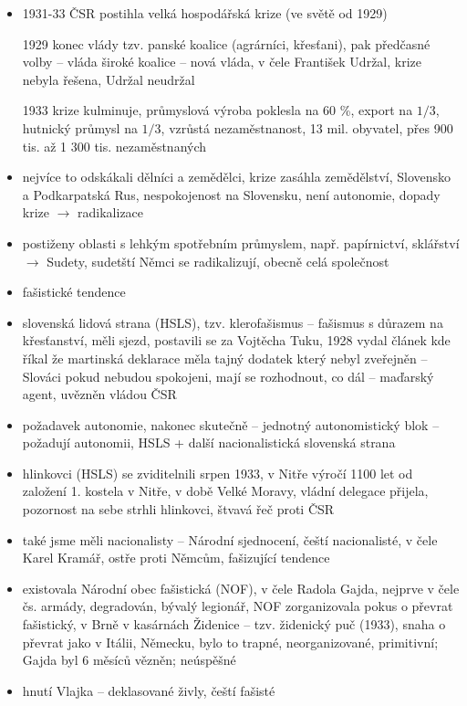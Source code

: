 \documentclass{article}
\begin{document}
\begin{itemize}
    \item 1931-33 ČSR postihla velká hospodářská krize (ve světě od 1929)
    \item[1929] konec vlády tzv. panské koalice (agrárníci, křesťani), pak předčasné volby -- vláda široké koalice -- nová vláda, v čele František Udržal, krize nebyla řešena, Udržal neudržal
    \item[1933] krize kulminuje, průmyslová výroba poklesla na 60 \%, export na $1/3$, hutnický průmysl na $1/3$, vzrůstá nezaměstnanost, 13 mil. obyvatel, přes 900 tis. až 1 300 tis. nezaměstnaných
    \item nejvíce to odskákali dělníci a zemědělci, krize zasáhla zemědělství, Slovensko a Podkarpatská Rus, nespokojenost na Slovensku, není autonomie, dopady krize $\rightarrow$ radikalizace
    \item postiženy oblasti s lehkým spotřebním průmyslem, např. papírnictví, sklářství $\rightarrow$ Sudety, sudetští Němci se radikalizují, obecně celá společnost
    \item fašistické tendence
    \item slovenská lidová strana (HSLS), tzv. klerofašismus -- fašismus s důrazem na křesťanství, měli sjezd, postavili se za Vojtěcha Tuku, 1928 vydal článek kde říkal že martinská deklarace měla tajný dodatek který nebyl zveřejněn -- Slováci pokud nebudou spokojeni, mají se rozhodnout, co dál -- maďarský agent, uvězněn vládou ČSR
    \item požadavek autonomie, nakonec skutečně -- jednotný autonomistický blok -- požadují autonomii, HSLS + další nacionalistická slovenská strana
    \item hlinkovci (HSLS) se zviditelnili srpen 1933, v Nitře výročí 1100 let od založení 1. kostela v Nitře, v době Velké Moravy, vládní delegace přijela, pozornost na sebe strhli hlinkovci, štvavá řeč proti ČSR
    \item také jsme měli nacionalisty -- Národní sjednocení, čeští nacionalisté, v čele Karel Kramář, ostře proti Němcům, fašizující tendence
    \item existovala Národní obec fašistická (NOF), v čele Radola Gajda, nejprve v čele čs. armády, degradován, bývalý legionář, NOF zorganizovala pokus o převrat fašistický, v Brně v kasárnách Židenice -- tzv. židenický puč (1933), snaha o převrat jako v Itálii, Německu, bylo to trapné, neorganizované, primitivní; Gajda byl 6 měsíců vězněn; neúspěšné
    \item hnutí Vlajka -- deklasované živly, čeští fašisté

\end{itemize}
\end{document}
